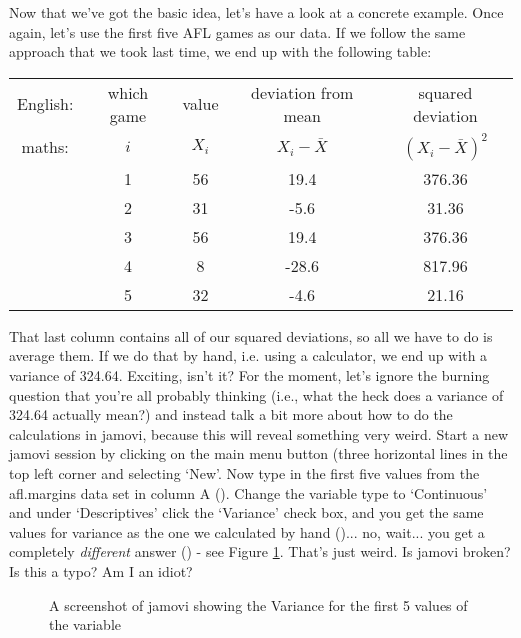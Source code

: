 Now that we've got the basic idea, let's have a look at a concrete example. Once again, let's use the first five AFL games as our data. If we follow the same approach that we took last time, we end up with the following table:\\
\begin{center}
\begin{tabular}{ccccc} 
English: & which game & value & deviation from mean & squared deviation \\
maths: & $i$ & $X_i$ & $X_i - \bar{X}$ &  $(X_i - \bar{X})^2$ \\ \hline
& 1 & 56 & 19.4  & 376.36\\
& 2 & 31 &  -5.6 & 31.36\\ 
& 3 & 56 & 19.4  & 376.36\\
& 4 & 8 & -28.6  & 817.96\\
& 5 & 32 & -4.6  & 21.16 \\
\end{tabular}
\end{center}
That last column contains all of our squared deviations, so all we have to do is average them. If we do that by hand, i.e. using a calculator, we end up with a variance of 324.64. Exciting, isn't it? For the moment, let's ignore the burning question that you're all probably thinking (i.e., what the heck does a variance of 324.64 actually mean?) and instead talk a bit more about how to do the calculations in jamovi, because this will reveal something very weird. Start a new jamovi session by clicking on the main menu button (three horizontal lines in the top left corner and selecting `New'. Now type in the first five values from the afl.margins data set in column A (). Change the variable type to `Continuous' and under `Descriptives' click the `Variance' check box, and you get the same values for variance as the one we calculated by hand ()... no, wait... you get a completely {\it different} answer () - see Figure \ref{fig:aflsmall_margins_variance1}. That's just weird. Is jamovi broken? Is this a typo? Am I an idiot? 

\vspace{1cm}
\begin{figure}[h]
\begin{center}
\caption{A screenshot of jamovi showing the Variance for the first 5 values of the  variable }
\label{fig:aflsmall_margins_variance1}
\HR
\end{center}
\end{figure}

